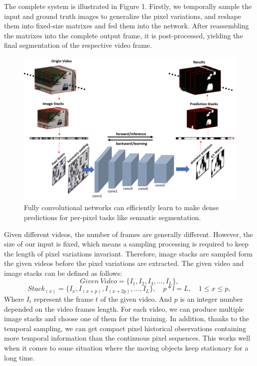 \documentclass[runningheads,a4paper]{llncs}
\begin{document}
The complete system is illustrated in Figure 1. Firstly, we temporally sample the input and ground truth images to generalize the pixel variations, and reshape them into fixed-size matrixes and fed them into the network. After reassembling the matrixes into the complete output frame, it is post-processed, yielding the final segmentation of the respective video frame.
\begin{figure}
    \centering
    \includegraphics[width=\textwidth]{figure/fig2}
    \caption{Fully convolutional networks can efficiently learn to make dense predictions for per-pixel tasks like semantic segmentation.}
    \label{flow_chart}
\end{figure}
Given different videos, the number of frames are generally different. However, the size of our input is fixed, which means a sampling processing is required to keep the length of pixel variations invariant. Therefore, image stacks are sampled form the given videos before the pixel variations are extracted. The given video and image stacks can be defined as follows: 
\begin{equation}
	Given \  Video=\{ I_1,I_2,I_3,\dots,I_L\} ,
\end{equation}
\begin{equation}
Stack_{(x)}=\{I_x,I_{(x+p)},I_{(x+2p)},\dots,I_L \},\quad p*l=L,\quad 1\leqslant   x\leqslant p , 
\end{equation}
Where $I_t$ represent the frame $t$ of the given video. And $p$ is an integer number depended on the video frames length. For each video, we can produce multiple image stacks and choose one of them for the training. In addition, thanks to the temporal sampling, we can get compact pixel historical observations containing more temporal information than the continuous pixel sequences. This works well when it comes to some situation where the moving objects keep stationary for a long time. 
\end{document}
